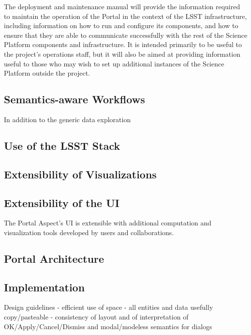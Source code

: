 The deployment and maintenance manual will provide the information required to maintain the operation of the Portal in the context of the LSST infrastructure, including information on how to run and configure its components, and how to ensure that they are able to communicate successfully with the rest of the Science Platform components and infrastructure.
It is intended primarily to be useful to the project's operations staff, but it will also be aimed at providing information useful to those who may wish to set up additional instances of the Science Platform outside the project.

\subsection{Semantics-aware Workflows}\label{semantics-aware-workflows}

In addition to the generic data exploration 

\subsection{Use of the LSST Stack}\label{use-of-the-lsst-stack}

\subsection{Extensibility of Visualizations}\label{extensibility-of-visualizations}

\subsection{Extensibility of the UI}\label{extensibility-of-the-ui}

The Portal Aspect's UI is extensible with additional computation and visualization tools developed by users and collaborations.

\subsection{Portal Architecture}

\subsection{Implementation}

Design guidelines
- efficient use of space
- all entities and data usefully copy/pasteable
- consistency of layout and of interpretation of OK/Apply/Cancel/Dismiss and modal/modeless semantics for dialogs


